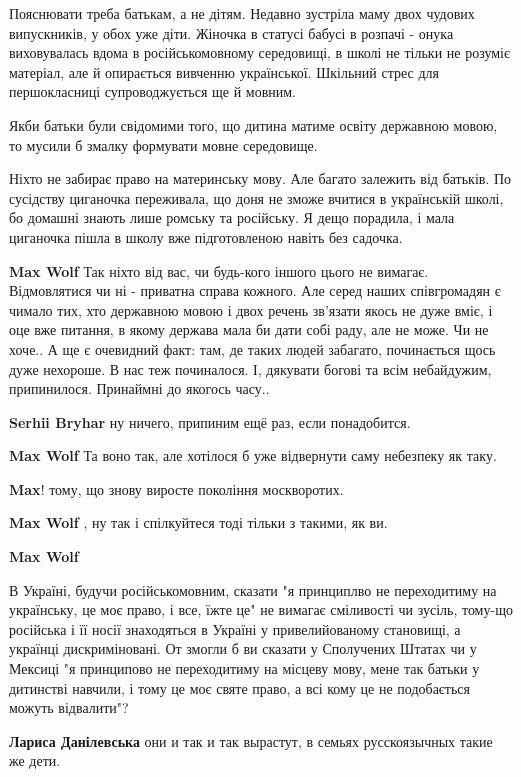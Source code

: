 \begin{itemize}
\begin{itemize}
Пояснювати треба батькам, а не дітям. Недавно зустріла маму двох чудових
випускників, у обох уже діти. Жіночка в статусі бабусі в розпачі - онука
виховувалась вдома в російськомовному середовищі, в школі не тільки не розуміє
матеріал, але й опирається вивченню української. Шкільний стрес для
першокласниці супроводжується ще й мовним.

Якби батьки були свідомими того, що дитина матиме освіту державною мовою, то
мусили б змалку формувати мовне середовище.

Ніхто не забирає право на материнську мову. Але багато залежить від батьків. По
сусідству циганочка переживала, що доня не зможе вчитися в українській школі,
бо домашні знають лише ромську та російську. Я дещо порадила, і мала циганочка
пішла в школу вже підготовленою навіть без садочка.

\textbf{Max Wolf} Так ніхто від вас, чи будь-кого іншого цього не вимагає.
Відмовлятися чи ні - приватна справа кожного. Але серед наших співгромадян є
чимало тих, хто державною мовою і двох речень зв'язати якось не дуже вміє, і
оце вже питання, в якому держава мала би дати собі раду, але не може. Чи не
хоче.. А ще є очевидний факт: там, де таких людей забагато, починається щось
дуже нехороше. В нас теж починалося. І, дякувати богові та всім небайдужим,
припинилося. Принаймні до якогось часу..

\textbf{Serhii Bryhar} ну ничего, припиним ещё раз, если понадобится.

\textbf{Max Wolf} Та воно так, але хотілося б уже відвернути саму небезпеку як таку.

\textbf{Max}! тому, що знову виросте покоління москворотих.

\textbf{Max Wolf} , ну так і спілкуйтеся тоді тільки з такими, як ви.

\textbf{Max Wolf}

В Україні, будучи російськомовним, сказати "я принциплво не переходитиму на
українську, це моє право, і все, їжте це" не вимагає сміливості чи зусіль,
тому-що російська і її носії знаходяться в Україні у привелийованому становищі,
а українці дискриміновані. От змогли б ви сказати у Сполучених Штатах чи у
Мексиці "я принципово не переходитиму на місцеву мову, мене так батьки у
дитинстві навчили, і тому це моє святе право, а всі кому це не подобається
можуть відвалити"?


\textbf{Лариса Данілевська} они и так и так вырастут, в семьях русскоязычных такие же дети.


\end{itemize}
\end{itemize}
